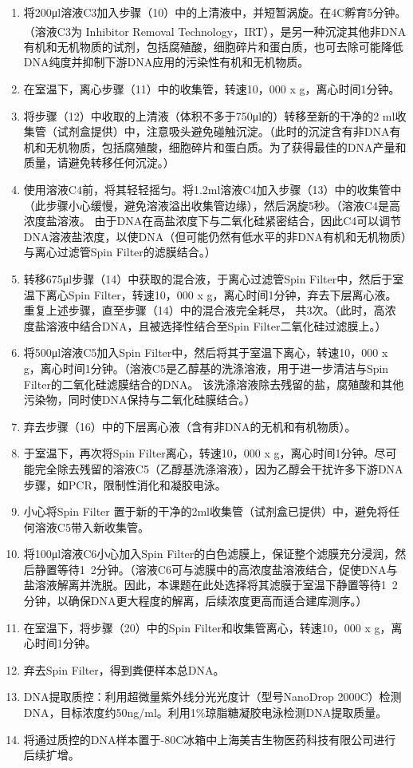 \begin{enumerate}
      \item 将200μl溶液C3加入步骤（10）中的上清液中，并短暂涡旋。在4\textdegree C孵育5分钟。（溶液C3为 Inhibitor Removal Technology\textsuperscript{\textregistered}，IRT），是另一种沉淀其他非DNA有机和无机物质的试剂，包括腐殖酸，细胞碎片和蛋白质，也可去除可能降低DNA纯度并抑制下游DNA应用的污染性有机和无机物质。
      \item 在室温下，离心步骤（11）中的收集管，转速10，000 x g，离心时间1分钟。
      \item 将步骤（12）中收取的上清液（体积不多于750μl的）转移至新的干净的2 ml收集管（试剂盒提供）中，注意吸头避免碰触沉淀。（此时的沉淀含有非DNA有机和无机物质，包括腐殖酸，细胞碎片和蛋白质。为了获得最佳的DNA产量和质量，请避免转移任何沉淀。）
      \item 使用溶液C4前，将其轻轻摇匀。将1.2ml溶液C4加入步骤（13）中的收集管中（此步骤小心缓慢，避免溶液溢出收集管边缘），然后涡旋5秒。（溶液C4是高浓度盐溶液。 由于DNA在高盐浓度下与二氧化硅紧密结合，因此C4可以调节DNA溶液盐浓度，以使DNA（但可能仍然有低水平的非DNA有机和无机物质）与离心过滤管Spin Filter的滤膜结合。）
      \item 转移675μl步骤（14）中获取的混合液，于离心过滤管Spin Filter中，然后于室温下离心Spin Filter，转速10，000 x g，离心时间1分钟，弃去下层离心液。重复上述步骤，直至步骤（14）中的混合液完全耗尽， 共3次。（此时，高浓度盐溶液中结合DNA，且被选择性结合至Spin Filter二氧化硅过滤膜上。）
      \item 将500μl溶液C5加入Spin Filter中，然后将其于室温下离心，转速10，000 x g，离心时间1分钟。（溶液C5是乙醇基的洗涤溶液，用于进一步清洁与Spin Filter的二氧化硅滤膜结合的DNA。 该洗涤溶液除去残留的盐，腐殖酸和其他污染物，同时使DNA保持与二氧化硅膜结合。）
      \item 弃去步骤（16）中的下层离心液（含有非DNA的无机和有机物质）。
      \item 于室温下，再次将Spin Filter离心，转速10，000 x g，离心时间1分钟。尽可能完全除去残留的溶液C5（乙醇基洗涤溶液），因为乙醇会干扰许多下游DNA步骤，如PCR，限制性消化和凝胶电泳。
      \item 小心将Spin Filter 置于新的干净的2ml收集管（试剂盒已提供）中，避免将任何溶液C5带入新收集管。
      \item 将100μl溶液C6小心加入Spin Filter的白色滤膜上，保证整个滤膜充分浸润，然后静置等待1~2分钟。（溶液C6可与滤膜中的高浓度盐溶液结合，促使DNA与盐溶液解离并洗脱。因此，本课题在此处选择将其滤膜于室温下静置等待1~2分钟，以确保DNA更大程度的解离，后续浓度更高而适合建库测序。）
      \item 在室温下，将步骤（20）中的Spin Filter和收集管离心，转速10，000 x g，离心时间1分钟。
      \item 弃去Spin Filter，得到粪便样本总DNA。
      \item DNA提取质控：利用超微量紫外线分光光度计（型号NanoDrop 2000C）检测DNA，目标浓度约50ng/ml。利用1\%琼脂糖凝胶电泳检测DNA提取质量。
      \item 将通过质控的DNA样本置于-80\textdegree C冰箱中上海美吉生物医药科技有限公司进行后续扩增。
    \end{enumerate}

